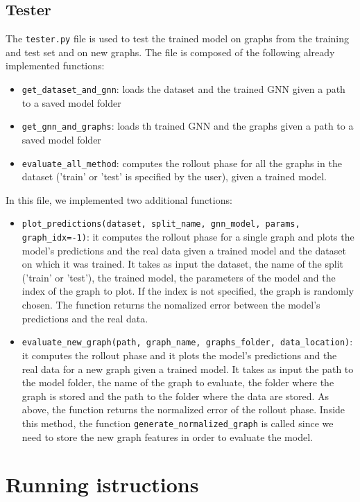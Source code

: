 \documentclass[11pt,a4paper]{article}
\begin{document}
\subsection*{Tester}
The \texttt{tester.py} file is used to test the trained model on graphs from the training and test set and on new graphs. The file is composed of the following already implemented functions: 
\begin{itemize}
    \item \texttt{get\_dataset\_and\_gnn}: loads the dataset and the trained GNN given a path to a saved model folder
    \item \texttt{get\_gnn\_and\_graphs}: loads th trained GNN and the graphs given a path to a saved model folder
    \item \texttt{evaluate\_all\_method}: computes the rollout phase for all the graphs in the dataset ('train' or 'test' is specified by the user), given a trained model. 
\end{itemize}

In this file, we implemented two additional functions:
\begin{itemize}
    \item \texttt{plot\_predictions(dataset, split\_name, gnn\_model, params, graph\_idx=-1)}: it computes the rollout phase for a single graph and plots the model's predictions and the real data given a trained model and the dataset on which it was trained. It takes as input the dataset, the name of the split ('train' or 'test'), the trained model, the parameters of the model and the index of the graph to plot. If the index is not specified, the graph is randomly chosen. The function returns the nomalized error between the model's predictions and the real data.
    \item \texttt{evaluate\_new\_graph(path, graph\_name, graphs\_folder, data\_location)}: it computes the rollout phase and it plots the model's predictions and the real data for a new graph given a trained model. It takes as input the path to the model folder, the name of the graph to evaluate, the folder where the graph is stored and the path to the folder where the data are stored. As above, the function returns the normalized error of the rollout phase. Inside this method, the function \texttt{generate\_normalized\_graph} is called since we need to store the new graph features in order to evaluate the model.
\end{itemize}

\section{Running istructions}
\end{document}
